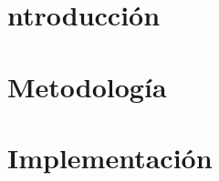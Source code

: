 \documentclass[11pt]{article}
\renewcommand{\{}{\left\lbrace}
\renewcommand{\}}{\right\rbrace}
\begin{document}
\section{ntroducción}


\section{Metodología}


\section{Implementación}

%
%






 


% 
% 
% 
\end{document}
